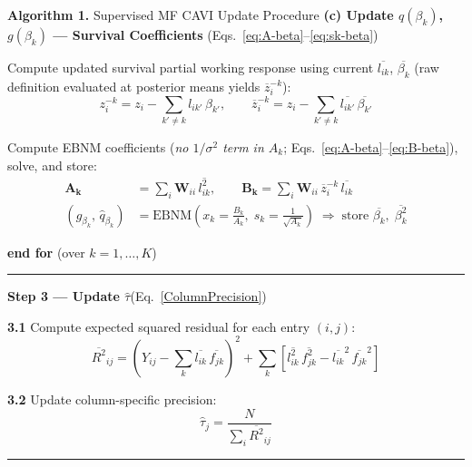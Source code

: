 \documentclass{article}[12pt]
\begin{document}
\begin{algobox}{\textbf{Algorithm 1.} Supervised MF CAVI Update Procedure}
\medskip
\hspace{2em}\textbf{(c) Update $q(\beta_k)$, $g(\beta_k)$ --- Survival Coefficients}
\quad(Eqs.~\ref{eq:A-beta}--\ref{eq:sk-beta})

\medskip
\hspace{3em}Compute updated survival partial working response using current $\overline{l_{ik}}$, $\overline{\beta_k}$
(raw definition evaluated at posterior means yields $\overline{z}^{-k}_i$):
\[
    z_i^{-k} = z_i - \sum_{k'\neq k} l_{ik'}\,\beta_{k'},
    \qquad
    \overline{z}^{-k}_i = z_i - \sum_{k'\neq k}\overline{l_{ik'}}\,\overline{\beta_{k'}}
\]

\hspace{3em}Compute EBNM coefficients (\textit{no $1/\sigma^2$ term in $A_k$}; Eqs.~\ref{eq:A-beta}--\ref{eq:B-beta}), solve, and store:
\begin{align*}
    \mathbf{A_k} &= \sum_i \mathbf{W}_{ii}\,\overline{l_{ik}^2},
    \qquad
    \mathbf{B_k} = \sum_i \mathbf{W}_{ii}\,\overline{z}^{-k}_i\,\overline{l_{ik}}\\
    \left(\hat{g}_{\beta_k},\,\hat{q}_{\beta_k}\right)
    &= \mathrm{EBNM}\!\left(x_k = \tfrac{B_k}{A_k},\; s_k = \tfrac{1}{\sqrt{A_k}}\right)
    \;\Rightarrow\;\text{store }\overline{\beta_k},\; \overline{\beta_k^2}
\end{align*}

\medskip
\hspace{1em}\textbf{end for} (over $k = 1,\ldots,K$)

\medskip
\hrule
\medskip

\hspace{1em}\textbf{Step 3 --- Update $\hat{\tau}$}\quad(Eq.~\ref{ColumnPrecision})

\medskip
\hspace{2em}\textbf{3.1}\hspace{0.5em} Compute expected squared residual for each entry $(i,j)$:
\[
    \overline{R^2}_{ij} = \!\left(Y_{ij} - \sum_k \overline{l_{ik}}\,\overline{f_{jk}}\right)^{\!2}
                         + \sum_k\!\left[\overline{l^{2}_{ik}}\,\overline{f^{2}_{jk}}
                           - \overline{l_{ik}}^2\,\overline{f_{jk}}^2\right]
\]

\hspace{2em}\textbf{3.2}\hspace{0.5em} Update column-specific precision:
\[
    \hat{\tau}_j = \frac{N}{\displaystyle\sum_i \overline{R^2}_{ij}}
\]

\medskip
\hrule
\medskip


\end{algobox}
\end{document}
